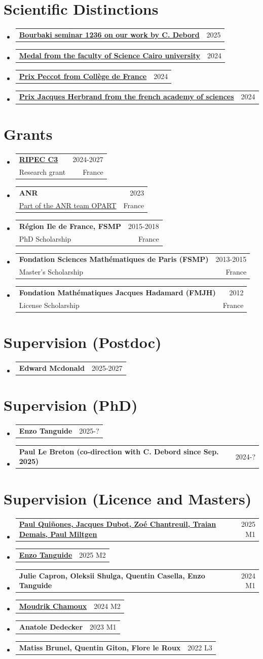 \documentclass[A4,11pt]{article}
\makeatletter
\newcommand{\CVSubheading}[4]{
  \vspace{-2pt}\item
    \begin{tabular*}{0.97\textwidth}[t]{l@{\extracolsep{\fill}}r}
      \textbf{#1} & #2 \\
      \small#3 & \small #4 \\
    \end{tabular*}\vspace{-7pt}
}
\newcommand{\CVSubheadingshort}[2]{
  \vspace{-2pt}\item
    \begin{tabular*}{0.97\textwidth}[t]{l@{\extracolsep{\fill}}r}
      \textbf{#1} & #2 \\
    \end{tabular*}\vspace{-7pt}
}
\newcommand{\CVSubHeadingListStart}{\begin{itemize}[leftmargin=0.5cm, label={}]}
\newcommand{\CVSubHeadingListEnd}{\end{itemize}}
\makeatother
\begin{document}
\section{Scientific Distinctions}
\CVSubHeadingListStart
\CVSubheadingshort{\href{https://www.bourbaki.fr/TEXTES/Exp1236-Debord.pdf}{{Bourbaki seminar 1236 on our work by C. Debord}}}{2025}{}{}
\CVSubheadingshort{\href{}{Medal from the faculty of Science Cairo university}}{2024}{}{}
\CVSubheadingshort{\href{https://www.college-de-france.fr/fr/personne/omar-mohsen}{{Prix Peccot from Collège de France}}}{2024}{}{}
\CVSubheadingshort{\href{https://www.insmi.cnrs.fr/en/cnrsinfo/prix-academie-des-sciences-2024-mathematiques}{{Prix Jacques Herbrand from the french academy of sciences}}}{2024}{}{}
\CVSubHeadingListEnd

\section{Grants}
\CVSubHeadingListStart
\CVSubheading
{\href{}{RIPEC C3}}{2024-2027}{Research grant}{France}
\CVSubheading
{ANR}{2023}
{\href{https://anr.fr/Project-ANR-23-CE40-0016}{{Part of the ANR team OPART}}}{France}
\CVSubheading
{Région Ile de France, FSMP}{2015-2018}
{PhD Scholarship}{France}
\CVSubheading
{Fondation Sciences Mathématiques de Paris (FSMP)}{2013-2015}
{Master's Scholarship}{France}
\CVSubheading
{Fondation Mathématiques Jacques Hadamard (FMJH)}{2012}
{License Scholarship}{France}
\CVSubHeadingListEnd
\section{Supervision (Postdoc)}
\CVSubHeadingListStart
\CVSubheadingshort{Edward Mcdonald}{2025-2027}
\CVSubHeadingListEnd
\section{Supervision (PhD)}
\CVSubHeadingListStart
\CVSubheadingshort{Enzo Tanguide}{2025-?}
\CVSubheadingshort{Paul Le Breton (co-direction with C. Debord since Sep. 2025)}{2024-?}
\CVSubHeadingListEnd


\section{Supervision (Licence and Masters)}
\CVSubHeadingListStart
\CVSubheadingshort{\href{}{Paul Quiñones, Jacques Dubot, Zoé Chantreuil, Traian Demais, Paul Miltgen}}{2025 M1}
\CVSubheadingshort{\href{}{Enzo Tanguide}}{2025 M2}
\CVSubheadingshort{Julie Capron, Oleksii Shulga, Quentin Casella, Enzo Tanguide}{2024 M1}
\CVSubheadingshort{\href{}{Moudrik Chamoux}}{2024 M2}
\CVSubheadingshort{Anatole Dedecker}{2023 M1}
\CVSubheadingshort{Matiss Brunel, Quentin Giton, Flore le Roux}{2022 L3}
\CVSubHeadingListEnd
\end{document}
